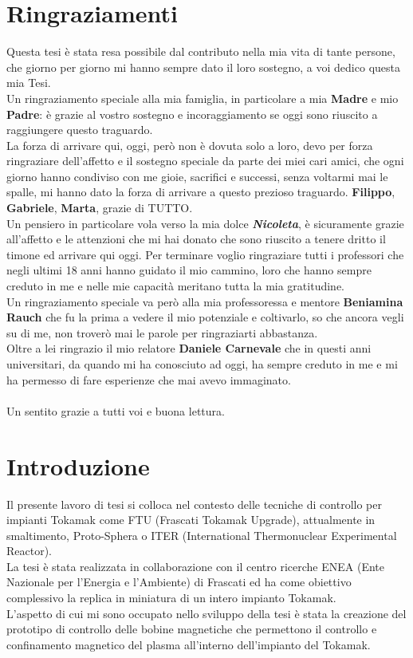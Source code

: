 \chapter*{Ringraziamenti}
\vspace{-8mm}
Questa tesi è stata resa possibile dal contributo nella mia vita di tante persone, che giorno per giorno mi hanno sempre dato il loro sostegno, a voi dedico questa mia Tesi.\\
Un ringraziamento speciale alla mia famiglia, in particolare a mia \textbf{Madre} e mio \textbf{Padre}: è grazie al vostro sostegno e incoraggiamento se oggi sono riuscito a raggiungere questo traguardo.\\
La forza di arrivare qui, oggi, però non è dovuta solo a loro, devo per forza ringraziare dell'affetto e il sostegno speciale da parte dei miei cari amici, che ogni giorno hanno condiviso con me gioie, sacrifici e successi, senza voltarmi mai le spalle, mi hanno dato la forza di arrivare a questo prezioso traguardo. \textbf{Filippo}, \textbf{Gabriele}, \textbf{Marta}, grazie di TUTTO.\\
Un pensiero in particolare vola verso la mia dolce \textbf{\textit{Nicoleta}}, è sicuramente grazie all'affetto e le attenzioni che mi hai donato che sono riuscito a tenere dritto il timone ed arrivare qui oggi.
Per terminare voglio ringraziare tutti i professori che negli ultimi 18 anni hanno guidato il mio cammino, loro che hanno sempre creduto in me e nelle mie capacità meritano tutta la mia gratitudine.\\
Un ringraziamento speciale va però alla mia professoressa e mentore \textbf{Beniamina Rauch} che fu la prima a vedere il mio potenziale e coltivarlo, so che ancora vegli su di me, non troverò mai le parole per ringraziarti abbastanza.\\
Oltre a lei ringrazio il mio relatore \textbf{Daniele Carnevale} che in questi anni universitari, da quando mi ha conosciuto ad oggi, ha sempre creduto in me e mi ha permesso di fare esperienze che mai avevo immaginato.\\ \\
Un sentito grazie a tutti voi e buona lettura.


\chapter*{Introduzione}
Il presente lavoro di tesi si colloca nel contesto delle tecniche di controllo per impianti Tokamak come
FTU (Frascati Tokamak Upgrade), attualmente in smaltimento, Proto-Sphera o ITER (International Thermonuclear Experimental Reactor).\\
La tesi è stata realizzata in collaborazione con il centro ricerche ENEA (Ente Nazionale per l’Energia e l’Ambiente) di Frascati ed ha come obiettivo complessivo la replica in miniatura di un intero impianto Tokamak.
\\L'aspetto di cui mi sono occupato nello sviluppo della tesi è stata la creazione del prototipo di controllo delle bobine magnetiche che permettono il controllo e confinamento magnetico del plasma all'interno dell'impianto del Tokamak.

